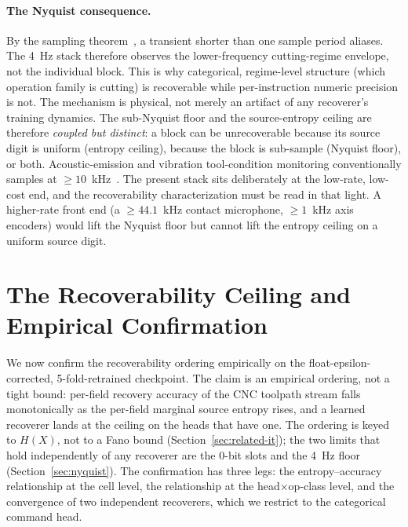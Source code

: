 \documentclass[entropy,article,submit,moreauthors,pdftex]{Definitions/mdpi}
\begin{document}
\paragraph{The Nyquist consequence.} By the sampling theorem~\cite{nyquist1928certain,shannon1949communication}, a transient shorter than one sample period aliases. The 4~Hz stack therefore observes the lower-frequency cutting-regime envelope, not the individual block. This is why categorical, regime-level structure (which operation family is cutting) is recoverable while per-instruction numeric precision is not. The mechanism is physical, not merely an artifact of any recoverer's training dynamics. The sub-Nyquist floor and the source-entropy ceiling are therefore \emph{coupled but distinct}: a block can be unrecoverable because its source digit is uniform (entropy ceiling), because the block is sub-sample (Nyquist floor), or both. Acoustic-emission and vibration tool-condition monitoring conventionally samples at $\ge\!10$~kHz~\cite{teti2010advanced}. The present stack sits deliberately at the low-rate, low-cost end, and the recoverability characterization must be read in that light. A higher-rate front end (a $\ge\!44.1$~kHz contact microphone, $\ge\!1$~kHz axis encoders) would lift the Nyquist floor but cannot lift the entropy ceiling on a uniform source digit.

\section{The Recoverability Ceiling and Empirical Confirmation}
\label{sec:ceiling}

We now confirm the recoverability ordering empirically on the float-epsilon-corrected, 5-fold-retrained checkpoint. The claim is an empirical ordering, not a tight bound: per-field recovery accuracy of the CNC toolpath stream falls monotonically as the per-field marginal source entropy rises, and a learned recoverer lands at the ceiling on the heads that have one. The ordering is keyed to $H(X)$, not to a Fano bound (Section~\ref{sec:related-it}); the two limits that hold independently of any recoverer are the $0$-bit slots and the 4~Hz floor (Section~\ref{sec:nyquist}). The confirmation has three legs: the entropy--accuracy relationship at the cell level, the relationship at the head$\times$op-class level, and the convergence of two independent recoverers, which we restrict to the categorical command head.
\end{document}
